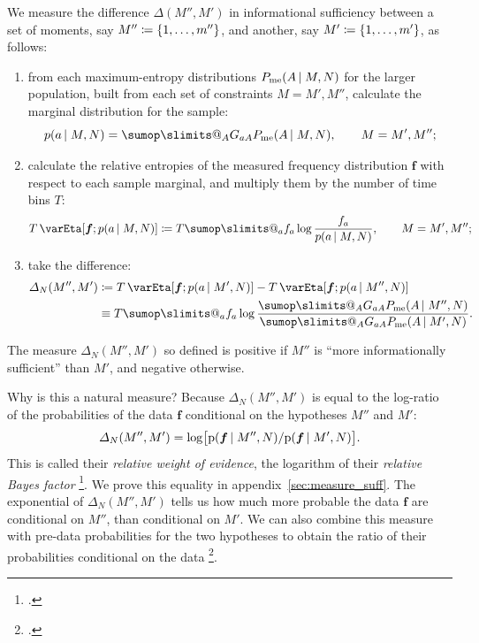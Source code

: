 \documentclass[\ifafour a4paper,12pt,\else a5paper,10pt,\fi%
onecolumn,oneside,article,%
british%
]{memoir}
\makeatletter
\theoremstyle{remark}
\theoremstyle{innote}
\def\sum{\DOTSI\sumop\slimits@}
\newcommand*{\citep}{\footcites}
\newcommand*{\defd}{\coloneqq}
\DeclarePairedDelimiter\set{\{}{\}}
\newcommand*{\pf}{\mathrm{p}}%
\renewcommand*{\|}{\nonscript\,\vert\nonscript\;\mathopen{}}
\newcommand*{\sect}{\S}%
\newcommand*{\chap}{ch.}%
\newcommand*{\chaps}{chs}%
\newcommand*{\cf}{{cf.}}
\newcommand*{\yG}{G}
\newcommand*{\yAv}{A}
\newcommand*{\yav}{a}
\newcommand*{\yff}{f}
\newcommand*{\yf}{\bm{\yff}}
\newcommand*{\ya}{\yav}%
\newcommand*{\yA}{\yAv}%
\newcommand*{\px}{P_{\text{me}}}
\newcommand*{\pxx}{p}
\newcommand*{\ydi}{\varDelta}
\newcommand*{\sh}{\mathrm{\varEta}}
\makeatother
\begin{document}
We measure the difference $\ydi(M'',M')$ in informational sufficiency
between a set of moments, say $M''\defd\set{1,\dotsc,m''}$, and another, say
$M'\defd \set{1,\dotsc,m'}$, as follows:
\begin{enumerate}[label=(\roman*)]
\item from each maximum-entropy distributions $\px(\yA \| M,N)$ for the larger
  population, built from each set of constraints $M=M',M''$, calculate the
  marginal distribution for the sample:
\begin{equation}
  \label{eq:sample_marginal}
  \pxx(\ya \| M, N) = \sum_{\yA}\yG_{\ya \yA}\px(\yA \| M,N),
  \qquad M=M',M'';
\end{equation}
\item calculate the relative entropies of the measured frequency
  distribution $\yf$ with respect to each sample marginal, and multiply
  them by the number of time bins $T$:
  \begin{equation}
    \label{eq:relentropy_T}
    T\,\sh[\yf; \pxx(\ya \| M,N)] \defd
    T  \sum_{\ya} \yff_{\ya} \log\frac{\yff_{\ya}}{\pxx(\ya \| M,N)},
    \qquad M=M',M'';    
  \end{equation}
\item take the difference: 
\begin{equation}
  \label{eq:measure_suffic}
  \begin{split}
  \ydi_{N}(M'',M') &\defd
  T \,\sh[\yf; \pxx(\ya \| M',N)]
  -
  T \,\sh[\yf; \pxx(\ya \| M'',N)]
  \\ &\equiv
T  \sum_{\ya} \yff_{\ya} \log\frac{
  \sum_{\yA}\yG_{\ya\yA}\px(\yA \| M'',N)}{
  \sum_{\yA}\yG_{\ya\yA}\px(\yA \| M',N)}.
\end{split}
\end{equation}
\end{enumerate}
The measure $\ydi_{N}(M'',M')$ so defined is positive if $M''$ is \enquote{more
  informationally sufficient} than $M'$, and negative otherwise.

Why is this a natural measure? Because $\ydi_{N}(M'',M')$ is equal to the
log-ratio of the probabilities of the data $\yf$ conditional on the
hypotheses $M''$ and $M'$:
\begin{equation}
  \label{eq:bayes_factor}
  \ydi_{N}(M'',M') =
  \log\bigl[\pf(\yf \| M'',N)/
  \pf(\yf \| M',N)\bigr].
\end{equation}
This is called their \emph{relative weight of evidence}, the logarithm of
their \emph{relative Bayes factor}
\citep[\chap~6]{good1950}{good1975,good1981,good1985,good1983}[\sect~1.4]{osteyeeetal1974}{mackay1992,kassetal1995}[see
also][p.~421]{jeffreys1936}[\chaps~V, VI, A]{jeffreys1939_r1983}. We prove
this equality in appendix~\ref{sec:measure_suff}. The exponential of
$\ydi_{N}(M'',M')$ tells us how much more probable the data $\yf$ are
conditional on $M''$, than conditional on $M'$. We can also combine this
measure with pre-data probabilities for the two hypotheses to obtain the
ratio of their probabilities conditional on the data
\citep[\cf][]{bretthorst2013}.
\end{document}

